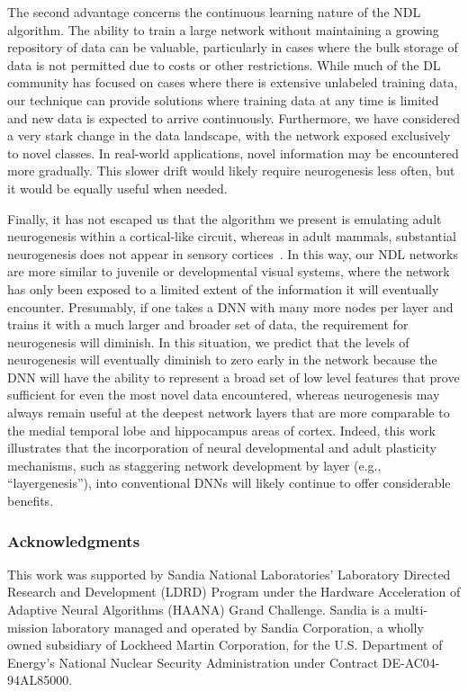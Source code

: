 \documentclass[10pt,conference]{IEEEtran}
\begin{document}
The second advantage concerns the continuous learning nature of the NDL algorithm. The ability to train a large network without maintaining a growing repository of data can be valuable, particularly in cases where the bulk storage of data is not permitted due to costs or other restrictions. While much of the DL community has focused on cases where there is extensive unlabeled training data, our technique can provide solutions where training data at any time is limited and new data is expected to arrive continuously. Furthermore, we have considered a very stark change in the data landscape, with the network exposed exclusively to novel classes. In real-world applications, novel information may be encountered more gradually. This slower drift would likely require neurogenesis less often, but it would be equally useful when needed.

Finally, it has not escaped us that the algorithm we present is emulating adult neurogenesis within a cortical-like circuit, whereas in adult mammals, substantial neurogenesis does not appear in sensory cortices~\cite{aimone2014regulation}. In this way, our NDL networks are more similar to juvenile or developmental visual systems, where the network has only been exposed to a limited extent of the information it will eventually encounter. Presumably, if one takes a DNN with many more nodes per layer and trains it with a much larger and broader set of data, the requirement for neurogenesis will diminish. In this situation, we predict that the levels of neurogenesis will eventually diminish to zero early in the network because the DNN will have the ability to represent a broad set of low level features that prove sufficient for even the most novel data encountered, whereas neurogenesis may always remain useful at the deepest network layers that are more comparable to the medial temporal lobe and hippocampus areas of cortex. Indeed, this work illustrates that the incorporation of neural developmental and adult plasticity mechanisms, such as staggering network development by layer (e.g., ``layergenesis''), into conventional DNNs will likely continue to offer considerable benefits.

\subsubsection*{Acknowledgments}
This work was supported by Sandia National Laboratories' Laboratory Directed Research and Development (LDRD) Program under the Hardware Acceleration of Adaptive Neural Algorithms (HAANA) Grand Challenge. Sandia is a multi-mission laboratory managed and operated by Sandia Corporation, a wholly owned subsidiary of Lockheed Martin Corporation, for the U.S. Department of Energy's National Nuclear Security Administration under Contract DE-AC04-94AL85000.



\end{document}
